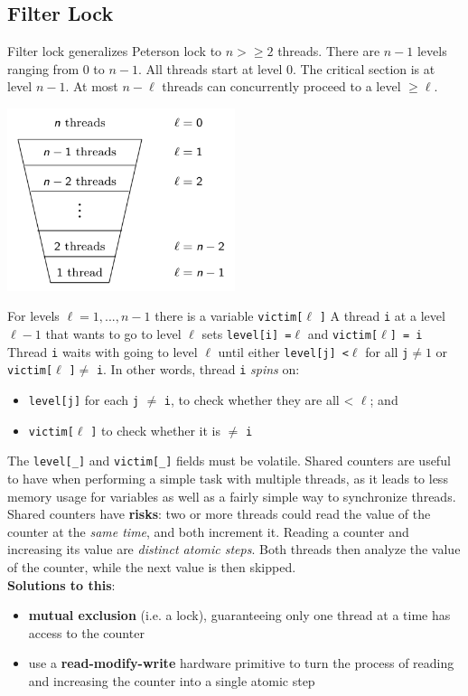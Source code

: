 \documentclass{article}
\begin{document}
\subsection{Filter Lock}
Filter lock generalizes Peterson lock to $n> \geq 2$ threads.
\bigbreak There are $n-1$ levels ranging from 0 to $n-1$.
\bigbreak All threads start at level 0. The critical section is at level $n-1$.
\bigbreak At most $n - \ell$ threads can concurrently proceed to a level $\geq \ell$.
\begin{center}
    \includegraphics[width=0.5\textwidth]{lecture2/filterlock.png}
\end{center}
For levels $\ell = 1, ..., n-1$ there is a variable \verb|victim[|$\ell$ \verb|]| 
\bigbreak A thread \verb|i| at a level $\ell - 1$ that wants to go to level $\ell$ sets \verb|level[i] =|$\ell$ and \verb|victim[|$\ell$\verb|] = i| 
\bigbreak Thread \verb|i| waits with going to level $\ell$ until either \verb|level[j] <|$\ell$ for all \verb|j|$\neq 1$ or \verb|victim[|$\ell$ \verb|]|$\neq$ \verb|i|.
\bigbreak In other words, thread \verb|i| \textit{spins} on:
\begin{itemize}
    \item \verb|level[j]| for each \verb|j| $\neq$ \verb|i|, to check whether they are all < $\ell$; and
    \item \verb|victim[|$\ell$ \verb|]| to check whether it is $\neq$ \verb|i|
\end{itemize}
The \verb|level[_]| and \verb|victim[_]| fields must be volatile.
\bigbreak Shared counters are useful to have when performing a simple task with multiple threads, as it leads to less memory usage for variables as well as a fairly simple way to synchronize threads. Shared counters have \textbf{risks}: two or more threads could read the value of the counter at the \textit{same time}, and both increment it. Reading a counter and increasing its value are \textit{distinct atomic steps}. Both threads then analyze the value of the counter, while the next value is then skipped.
\\\textbf{Solutions to this}:
\begin{itemize}
    \item \textbf{mutual exclusion} (i.e. a lock), guaranteeing only one thread at a time has access to the counter
    \item use a \textbf{read-modify-write} hardware primitive to turn the process of reading and increasing the counter into a single atomic step
\end{itemize}
\end{document}
